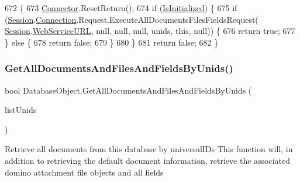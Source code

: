 \begin{DoxyCode}
672                                                                                      \{
673         \mbox{\hyperlink{class_connector}{Connector}}.ResetReturn();
674         \textcolor{keywordflow}{if} (\mbox{\hyperlink{class_database_object_a5fe036d32a30eb10d1b3f6a30263f740}{IsInitialized}}) \{
675             \textcolor{keywordflow}{if} (\mbox{\hyperlink{class_database_object_aa8484162b7d2a7c4c9426bca13c64c07}{Session}}.\mbox{\hyperlink{class_session_object_a014bdbf705a753540e19bfb53030c55c}{Connection}}.Request.ExecuteAllDocumentsFilesFieldsRequest(
      \mbox{\hyperlink{class_database_object_aa8484162b7d2a7c4c9426bca13c64c07}{Session}}.\mbox{\hyperlink{class_session_object_a697c071c812fbf7ad1166b896fb44c16}{WebServiceURL}}, null, null, null, unids, \textcolor{keyword}{this}, null)) \{
676                 \textcolor{keywordflow}{return} \textcolor{keyword}{true};
677             \} \textcolor{keywordflow}{else} \{
678                 \textcolor{keywordflow}{return} \textcolor{keyword}{false};
679             \}
680         \}
681         \textcolor{keywordflow}{return} \textcolor{keyword}{false};
682     \}
\end{DoxyCode}
\mbox{\label{class_database_object_a9eb9436d27f446982f0ec4ddce49e843}} 
\subsubsection{\texorpdfstring{Get\+All\+Documents\+And\+Files\+And\+Fields\+By\+Unids()}{GetAllDocumentsAndFilesAndFieldsByUnids()}\hspace{0.1cm}{\footnotesize\ttfamily [3/4]}}
{\footnotesize\ttfamily bool Database\+Object.\+Get\+All\+Documents\+And\+Files\+And\+Fields\+By\+Unids (\begin{DoxyParamCaption}\item[{I\+List}]{list\+Unids }\end{DoxyParamCaption})}



Retrieve all documents from this database by universal\+I\+Ds This function will, in addition to retrieving the default document information, retrieve the associated domino attachment file objects and all fields 


